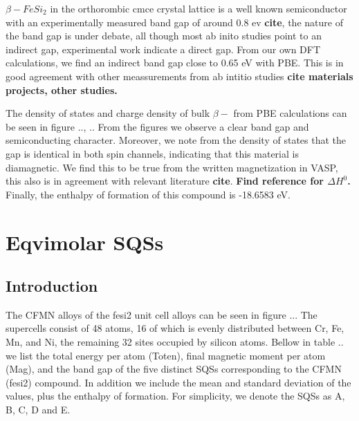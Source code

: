 $\beta-FeSi_2$ in the orthorombic cmce crystal lattice is a well known semiconductor with an experimentally measured band gap of around 0.8 ev \textbf{cite}, the nature of the band gap is under debate, all though most ab inito studies point to an indirect gap, experimental work indicate a direct gap. From our own DFT calculations, we find an indirect band gap close to 0.65 eV with PBE. This is in good agreement with other meassurements from ab intitio studies \textbf{cite materials projects, other studies.} 

The density of states and charge density of bulk $\beta-$ from PBE calculations can be seen in figure .., ..  From the figures we observe a clear band gap and semiconducting character. Moreover, we note from the density of states that the gap is identical in both spin channels, indicating that this material is diamagnetic. We find this to be true from the written magnetization in VASP, this also is in agreement with relevant literature \textbf{cite}. \textbf{Find reference for $\Delta H^0$.} Finally, the enthalpy of formation of this compound is -18.6583 eV.

\section{Eqvimolar SQSs}

\subsection{Introduction}

The CFMN alloys of the fesi2 unit cell alloys can be seen in figure ... The supercells consist of 48 atoms, 16 of which is evenly distributed between Cr, Fe, Mn, and Ni, the remaining 32 sites occupied by silicon atoms. Bellow in table .. we list the total energy per atom (Toten), final magnetic moment per atom (Mag), and the band gap of the five distinct SQSs corresponding to the CFMN (fesi2) compound. In addition we include the mean and standard deviation of the values, plus the enthalpy of formation. For simplicity, we denote the SQSs as A, B, C, D and E.

